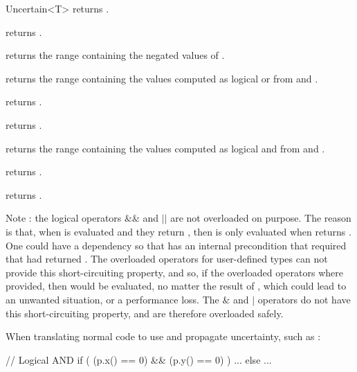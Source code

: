 \begin{ccRefClass}{Uncertain<T>}
  {returns .}

  {returns .}


  {returns the range containing the negated values of .}

  {returns the range containing the values computed as logical or from  and .}

  {returns .}

  {returns .}

  {returns the range containing the values computed as logical and from  and .}

  {returns .}

  {returns .}

  Note : the logical operators $\&\&$ and $||$ are not overloaded on purpose.  The reason
  is that, when  is evaluated and they return , then 
  is only evaluated when  returns .  One could have a dependency so
  that  has an internal precondition that required that  had returned .
  The overloaded operators for user-defined types can not provide this short-circuiting
  property, and so, if the overloaded operators where provided, then  would
  be evaluated, no matter the result of , which could lead to an unwanted
  situation, or a performance loss.  The $\&$ and $|$ operators do not have
  this short-circuiting property, and are therefore overloaded safely.

  When translating normal code to use and propagate uncertainty, such as :

\begin{ccExampleCode}
  // Logical AND
  if ( (p.x() == 0) && (p.y() == 0) )
    ...
  else
    ...


\end{ccExampleCode}
\end{ccRefClass}
